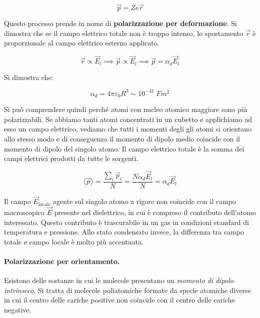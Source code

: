 \[
	\boxed{\vec{p} = Ze\vec{r}}
\]

Questo processo prende in nome di \textbf{polarizzazione per deformazione}. Si dimostra che se il campo elettrico totale non è troppo intenso, lo spostamento $ \vec{r}  $ è proporzionale al campo elettrico esterno applicato.

\[
	\vec{r} \propto \vec{E}_l \implies \vec{p} \propto \vec{E}_l \implies \vec{p} = \alpha_d  \vec{E}_l
\]

Si dimostra che:

\[
	\alpha_d = 4\pi \varepsilon_0 R^3 \sim 10^{-41} \; Fm^2
\]

Si può comprendere quindi perché atomi con nucleo atomico maggiore sono più polarizzabili.
Se abbiamo tanti atomi concentrati in un cubetto e applichiamo ad esso un campo elettrico, vediamo che tutti i momenti degli gli atomi si orientano allo stesso modo e di conseguenza il momento di dipolo medio coincide con il momento di dipolo del singolo atomo. Il campo elettrico totale è la somma dei campi elettrici prodotti da tutte le sorgenti.

\[
	\langle \vec{p} \rangle = \frac{\sum_i \vec{p}_i}{N} = \frac{N\alpha_d \vec{E}_l}{N} = \alpha_d\vec{E}_l
\]

Il campo $ \vec{E}_{\text{locale}}  $ agente sul singolo atomo a rigore non coincide con il campo macroscopico $ \vec{E}  $ presente nel dielettrico, in cui è compreso il contributo dell'atomo interessato. Questo contributo è trascurabile in un gas in condizioni standard di temperatura e pressione. Allo stato condensato invece, la differenza tra campo totale e campo locale è molto più accentuata.

\paragraph{Polarizzazione per orientamento.} Esistono delle sostanze in cui le molecole presentano un \emph{momento di dipolo intrinseco}. Si tratta di molecole poliatomiche formate da specie atomiche diverse in cui il centro delle cariche positive non coincide con il centro delle cariche negative.

